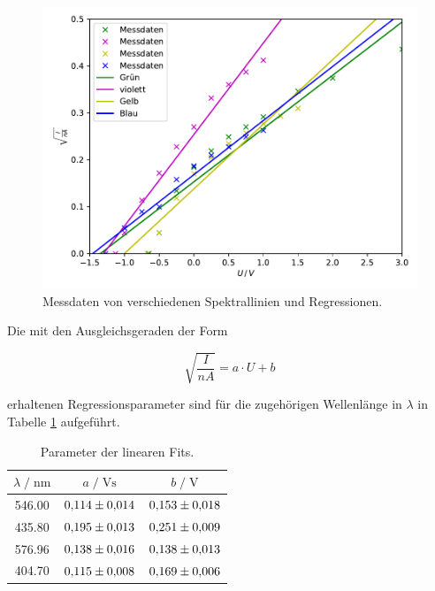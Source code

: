 \begin{figure}
  \centering
  \includegraphics{content/plot1.pdf}
  \caption{Messdaten von verschiedenen Spektrallinien und Regressionen.}
  \label{fig:plot1}
\end{figure}

Die mit den Ausgleichsgeraden der Form 

\begin{equation*}
\sqrt{\frac{I}{nA}} = a\cdot U + b 
\end{equation*}

erhaltenen Regressionsparameter sind für die zugehörigen Wellenlänge in $\lambda$ in Tabelle \ref{tab:para} aufgeführt. 

\begin{table}
    \centering
    \caption{Parameter der linearen Fits.}
    \label{tab:para}
    \begin{tabular}{c c c}
    \toprule
    $ \lambda \;/\; \si{\nano\meter} $ & $a \;/\; \si{\volt\second}$ &
    $ b \;/\; \si{\volt}$\\
    \midrule 
      546.00 & $\num{0.114+-0.014}$ & $\num{0.153+-0.018}$\\ %
      435.80 & $\num{0.195+-0.013}$ & $\num{0.251+-0.009}$\\ %
      576.96 & $\num{0.138+-0.016}$ & $\num{0.138+-0.013}$\\ %
      404.70 & $\num{0.115+-0.008}$ & $\num{0.169+-0.006}$\\ %
    \bottomrule
    \end{tabular}
\end{table}

